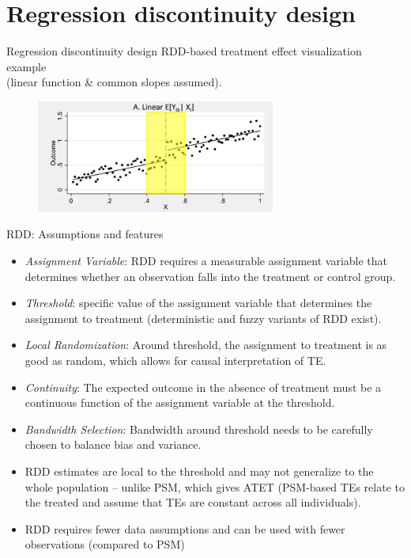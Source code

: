 \documentclass{beamer}
\begin{document}
\section{Regression discontinuity design}
\begin{frame}{Regression discontinuity design}
\centering
RDD-based treatment effect visualization example \\(linear function \& common slopes assumed).

\begin{figure}
    \includegraphics[trim = 0cm 0cm 0cm 0.65cm, clip,width=0.7\textwidth]{./IMG/RDD1.jpg}
    \label{fig:my_label}
\end{figure}    
\end{frame}
\begin{frame}{RDD: Assumptions and features}
 \footnotesize  
\begin{itemize}
    \item \emph{Assignment Variable}: RDD requires a measurable assignment variable that determines whether an observation falls into the treatment or control group.
    \item \emph{Threshold}: specific value of the assignment variable that determines the assignment to treatment (deterministic and fuzzy variants of RDD exist).
    \item \emph{Local Randomization}: Around threshold, the assignment to treatment is as good as random, which allows for causal interpretation of TE.
    \item \emph{Continuity}: The expected outcome in the absence of treatment must be a continuous function of the assignment variable at the threshold.
    \item \emph{Bandwidth Selection}: Bandwidth around threshold needs to be carefully chosen to balance bias and variance.
    \bigskip
    \item RDD estimates are local to the threshold and may not generalize to the whole population -- unlike PSM, which gives ATET (PSM-based TEs relate to the treated and assume that TEs are constant across all individuals).
    \item RDD requires fewer data assumptions and can be used with fewer observations (compared to PSM) 
\end{itemize}
    
\end{frame}
\end{document}
